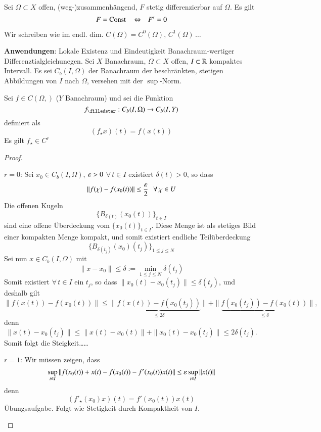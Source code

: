 \begin{cor}\label{1.16}
    Sei $\Omega \subset X$ offen, (weg-)zusammenhängend, $F$ stetig differenzierbar auf $\Omega$.
    Es gilt
    \[
        F= \mathrm{Const} \, \hspace{.25cm} \Leftrightarrow \hspace{.25cm} F'=0
    \]
\end{cor}
\begin{remark}
    Wir schreiben wie im endl. dim. $C(\Omega)= C^0(\Omega), \, C^1(\Omega)\, …$
\end{remark}

\noindent \textbf{Anwendungen}: Lokale Existenz und Eindeutigkeit Banachraum-wertiger
Differenztialgleichunegen. Sei $X$ Banachraum, $\Omega\subset X$ offen, $I\subset \mathbb{R}$
kompaktes Intervall. Es sei $C_b(I,\Omega)$ der Banachraum der beschränkten, stetigen Abbildungen
von $I$ nach $\Omega$, versehen mit der $\sup$-Norm.

\begin{lem}
    Sei $f\in C(\Omega, )$ ($Y$ Banachraum) und sei die Funktion
    \[
        f_\star: C_b(I,\Omega)\ra C_b(I,Y)
    \]
    definiert als
    \[
        (f_\star x)(t)= f(x(t))
    \]
    Es gilt $f_\star\in C^r$
\end{lem}

\begin{proof}
    \begin{description}
    \item{$r=0$:}
    Sei $x_0\in C_b(I,\Omega)$, $\varepsilon>0$ $\forall \, t \in I$ existiert $\delta(t)>0$, so dass
    \[
        \|f(\chi)-f(x_0(t))\|\leq \frac{\varepsilon}{2} \hspace{.25cm} \forall \, \chi\in U
    \]
    Die offenen Kugeln 
    \[
        \{ B_{\delta(t)}(x_0(t)) \}_{t\in I}
    \]
    sind eine offene Überdeckung vom $\{ x_0(t) \}_{t\in I}$. Diese Menge ist als stetiges Bild einer
    kompakten Menge kompakt, und somit existiert endliche Teilüberdeckung
    \[
        \{ B_{\delta(t_j)}(x_0)(t_j) \}_{1\leq j \leq N}
    \]
    Sei nun $x\in C_b(I,\Omega)$ mit
    \[
        \|x-x_0\|\leq \delta := \min_{1\leq j \leq N}\delta(t_j)
    \]
    Somit existiert $\forall \, t\in I$ ein $t_j$, so dass $\|x_0(t)-x_0(t_j)\|\leq \delta(t_j)$,
    und deshalb gilt
    \[
        \|f(x(t))- f(x_0(t))\|\leq \|\underbrace{f(x(t))-f(x_0(t_j))}_{\leq 2\delta}\|
        +\|\underbrace{f(x_0(t_j))-f(x_0(t))}_{\leq\delta}\|,
    \]
    denn
    \[
        \|x(t)-x_0(t_j)\|\leq \|x(t)-x_0(t)\|+\|x_0(t)-x_0(t_j)\|\leq 2\delta(t_j).
    \]
    Somit folgt die Steigkeit……
    \item{$r=1$:}
    Wir müssen zeigen, dass
    \[
        \sup_{t\in I} \|f(x_0(t))+x(t)- f(x_0(t)) - f'(x_0(t))x(t)\|\leq \varepsilon \sup_{t\in I}\|x(t)\|
    \]
    denn
    \[
        (f'_\star(x_0)x)(t)= f'(x_0(t))x(t)
    \]
    Übungsaufgabe. Folgt wie Stetigkeit durch Kompaktheit von $I$.
    \end{description}
    \[  \]
\end{proof}
